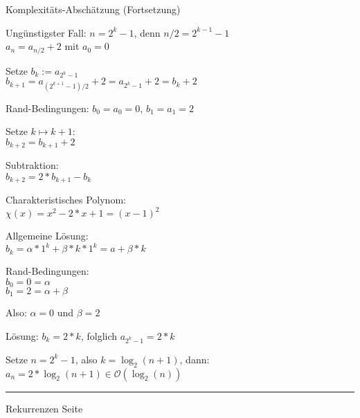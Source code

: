 \documentclass{slides}
\newcounter{mypage}
\newcommand{\Oh}{\mathcal{O}}
\begin{document}

\begin{slide}{}
\normalsize

\begin{center}
Komplexit\"ats-Absch\"atzung (Fortsetzung)
\end{center}
\vspace*{0.5cm}

\footnotesize
Ung\"unstigster Fall: $n = 2^k - 1$, denn $n/2 = 2^{k-1} - 1$ \\[0.3cm]
\hspace*{1.3cm} $a_n = a_{n/2} + 2$ mit $a_0 = 0$

Setze $b_k := a_{2^k - 1}$ \\[0.3cm]
\hspace*{1.3cm} $b_{k+1} = a_{(2^{k+1} - 1)/2} + 2 = a_{2^k - 1} + 2 = b_k + 2$

Rand-Bedingungen: $b_0 = a_0 = 0$, $b_1 = a_1 = 2$

Setze $k \mapsto k + 1$: \\[0.3cm]
\hspace*{1.3cm} $b_{k+2} = b_{k+1} + 2$

Subtraktion: \\[0.3cm]
\hspace*{1.3cm} $b_{k+2} = 2 * b_{k+1} - b_k$

Charakteristisches Polynom: \\[0.3cm]
\hspace*{1.3cm} $\chi(x) = x^2 - 2 * x + 1 = (x-1)^2$

Allgemeine L\"osung: \\[0.3cm]
\hspace*{1.3cm} $b_k = \alpha * 1^k + \beta * k * 1^k = a + \beta * k$

Rand-Bedingungen: \\[0.3cm]
\hspace*{1.3cm} $b_0 = 0 = \alpha$ \\[0.3cm]
\hspace*{1.3cm} $b_1 = 2 = \alpha + \beta$

Also: $\alpha = 0$ und $\beta = 2$

L\"osung: $b_k = 2 * k$, folglich $a_{2^k-1} = 2*k$

Setze $n = 2^k-1$, also $k = \log_2(n+1)$, dann: \\[0.3cm]
\hspace*{1.3cm} $a_n = 2*\log_2(n + 1)  \in \Oh\left(\log_2(n)\right)$

\vspace*{\fill}
\tiny \addtocounter{mypage}{1}
\rule{17cm}{1mm}
Rekurrenzen  \hspace*{\fill} Seite 
\end{slide}
\end{document}
